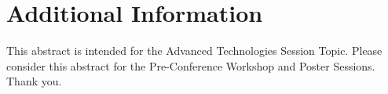 \documentclass{article}
\begin{document}
\section{Additional Information}
This abstract is intended for the Advanced Technologies Session Topic. Please consider this abstract for the Pre-Conference Workshop and Poster Sessions. Thank you. 
\end{document}
